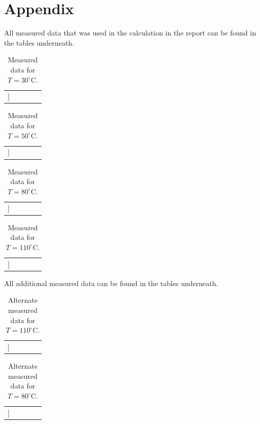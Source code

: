 \documentclass[a4paper]{article}
\begin{document}
\newpage

\section{Appendix}

All measured data that was used in the calculation in the report can be found in the tables underneath.
\newline

\begin{table}[H]
\centering
\begin{tabular}{r|rrrr}
\hline
[[table30]]
\end{tabular}
\caption{Measured data for $T=30^\circ\text{C}$.}
\label{tab:measure30}
\end{table}

\begin{table}[H]
\centering
\begin{tabular}{r|rrrr}
\hline
[[table50]]
\end{tabular}
\caption{Measured data for $T=50^\circ\text{C}$.}
\label{tab:measure50}
\end{table}

\begin{table}[H]
\centering
\begin{tabular}{r|rrrr}
\hline
[[table80]]
\end{tabular}
\caption{Measured data for $T=80^\circ\text{C}$.}
\label{tab:measure80}
\end{table}

\begin{table}[H]
\centering
\begin{tabular}{r|rrrr}
\hline
[[table110]]
\end{tabular}
\caption{Measured data for $T=110^\circ\text{C}$.}
\label{tab:measure110}
\end{table}

All additional measured data can be found in the tables underneath.
\newline

\begin{table}[H]
\centering
\begin{tabular}{r|rrrr}
\hline
[[table1102]]
\end{tabular}
\caption{Alternate measured data for $T=110^\circ\text{C}$.}
\label{tab:measure1102}
\end{table}

\begin{table}[H]
\centering
\begin{tabular}{r|rrrr}
\hline
[[table802]]
\end{tabular}
\caption{Alternate measured data for $T=80^\circ\text{C}$.}
\label{tab:measure1102}
\end{table}
\end{document}
